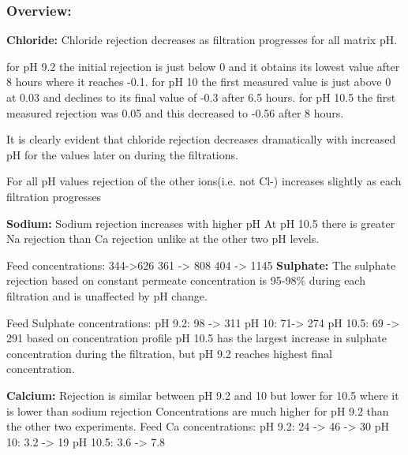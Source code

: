 \subsubsection{Overview:}
\textbf{Chloride:}
Chloride rejection decreases as filtration progresses for all matrix pH.

for pH 9.2 the initial rejection is just below 0 and it obtains its lowest value after 8 hours where it reaches -0.1.
for pH 10 the first measured value is just above 0 at 0.03 and declines to its final value of -0.3 after 6.5 hours.
for pH 10.5 the first measured rejection was 0.05 and this decreased to -0.56 after 8 hours.


It is clearly evident that chloride rejection decreases dramatically with increased pH for the values later on during the filtrations. 



For all pH values rejection of the other ions(i.e. not Cl-) increases slightly as each filtration progresses

\textbf{Sodium:}
Sodium rejection increases with higher pH
At pH 10.5 there is greater Na rejection than Ca rejection unlike at the other two pH levels.

Feed concentrations:
344->626
361 -> 808
404 -> 1145
\textbf{Sulphate:}
The sulphate rejection based on constant permeate concentration is 95-98\% during each filtration and is unaffected by pH change.

Feed Sulphate concentrations:
pH 9.2: 98 -> 311
pH 10: 71-> 274
pH 10.5: 69 -> 291
based on concentration profile pH 10.5 has the largest increase in sulphate concentration during the filtration, but pH 9.2 reaches highest final concentration. 


\textbf{Calcium: }
Rejection is similar between pH 9.2 and 10 but lower for 10.5 where it is lower than sodium rejection
Concentrations are much higher for pH 9.2 than the other two experiments.
Feed Ca concentrations:
pH 9.2: 24 -> 46 -> 30
pH 10: 3.2 -> 19
pH 10.5: 3.6 -> 7.8







